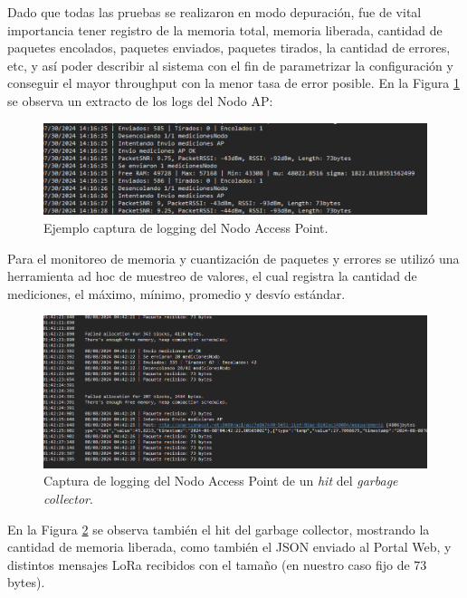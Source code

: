 Dado que todas las pruebas se realizaron en modo depuración, fue de vital importancia tener registro de la memoria total, memoria liberada, cantidad de paquetes encolados, paquetes enviados, paquetes tirados, la cantidad de errores, etc, y así poder describir al sistema con el fin de parametrizar la configuración y conseguir el mayor throughput con la menor tasa de error posible. En la Figura \ref{fig:pruebas_firmware_2} se observa un extracto de los logs del Nodo AP:

\begin{figure}[H]
    \centering
    \includegraphics[width=1\linewidth]{Figures/Firmware/pruebas_2.png}
    \caption{Ejemplo captura de logging del Nodo Access Point.}
    \label{fig:pruebas_firmware_2}
\end{figure}

Para el monitoreo de memoria y cuantización de paquetes y errores se utilizó una herramienta ad hoc de muestreo de valores, el cual registra la cantidad de mediciones, el máximo, mínimo, promedio y desvío estándar.

\begin{figure}[H]
    \centering
    \includegraphics[width=1\linewidth]{Figures/Firmware/pruebas_1.png}
    \caption{Captura de logging del Nodo Access Point de un \textit{hit} del \textit{garbage collector}.}
    \label{fig:pruebas_firmware_1}
\end{figure}

 En la Figura \ref{fig:pruebas_firmware_1} se observa también el hit del garbage collector, mostrando la cantidad de memoria liberada, como también el JSON enviado al Portal Web, y distintos mensajes LoRa recibidos con el tamaño (en nuestro caso fijo de 73 bytes).


